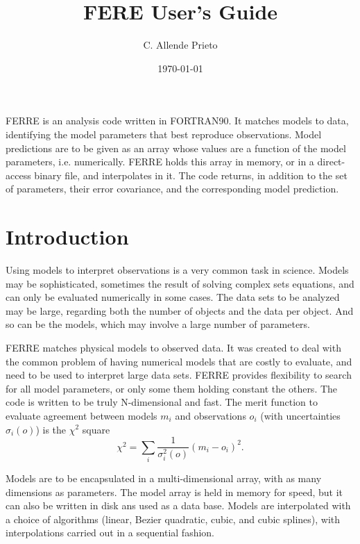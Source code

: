 \documentclass[12pt]{article}
\begin{document}
\title{FERE User's Guide}

\date{\today}
\author{C. Allende Prieto}

\maketitle

FERRE is an analysis code written in FORTRAN90. 
It matches models to data,  
identifying the model parameters that best
reproduce observations. 
Model predictions are to be given as an array whose values are a function of 
the model parameters, i.e. numerically. 
FERRE holds this array in memory, or in a direct-access binary file,
and interpolates in it. The code returns, in addition to the 
set of parameters, their error covariance, and the corresponding model prediction. 

\tableofcontents

\newpage

\section{Introduction}
\label{intro}

Using models to interpret observations is a very common task in 
science. Models may be sophisticated, sometimes the result 
of solving complex sets equations, and can only be evaluated numerically 
in some cases. The data sets to be analyzed may be large, regarding both 
the number of objects and the data per object. And so can be the models, 
which may involve a large number of parameters. 

FERRE matches physical models to observed data. It was created to 
deal with the common problem of having numerical models that are
costly to evaluate, and need to be used to interpret large data sets.
FERRE provides flexibility to search for all model parameters, or 
only some them holding constant the others. The code is written
to be truly N-dimensional and fast. The merit function to evaluate 
agreement between models ${m_i}$ and observations ${o_i}$ 
(with uncertainties ${\sigma_i(o)}$) is the $\chi^2$ square
\begin{equation}
\chi^2 = \sum_i \frac{1}{\sigma_i^2(o)} (m_i - o_i)^2.
\end{equation}

Models are to be
encapsulated in a multi-dimensional array, with as many dimensions
as parameters. The model array is held in memory for speed, but it can
also be written in disk ans used as a data base. Models are interpolated with a choice
of algorithms (linear, Bezier quadratic, cubic, and cubic splines), with 
interpolations carried out in a sequential fashion. 
\end{document}
